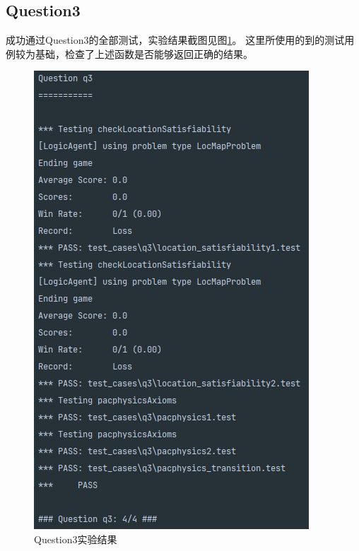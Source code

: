 \subsection{Question3}
成功通过Question3的全部测试，实验结果截图见图\ref{q3}。
这里所使用的到的测试用例较为基础，检查了上述函数是否能够返回正确的结果。
\begin{figure}[htbp]
    \centering
    \includegraphics[scale = 0.7]{pic/q3.png}
    \caption{Question3实验结果}\label{q3}
\end{figure}
